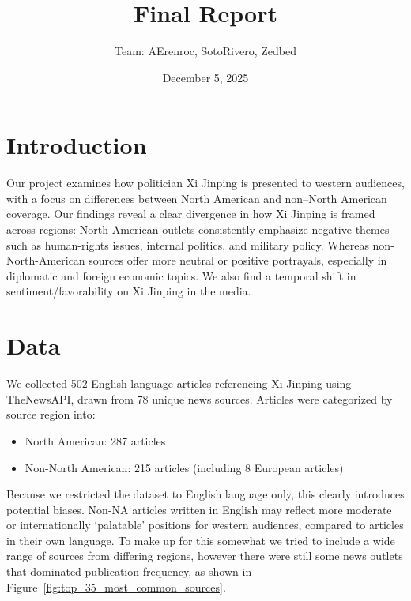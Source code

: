 \documentclass{article}
\title{Final Report}
\author{Team: AErenroc, SotoRivero, Zedbed}
\date{December 5, 2025}
\begin{document}
   \maketitle


   \section{Introduction}
   Our project examines how politician Xi Jinping is presented to western audiences, with a focus on differences between North American and non–North American coverage.
   Our findings reveal a clear divergence in how Xi Jinping is framed across regions: North American outlets consistently emphasize negative themes such as human-rights
    issues, internal politics, and military policy. Whereas non-North-American sources offer more neutral or positive portrayals, especially in diplomatic and foreign 
    economic topics. We also find a temporal shift in sentiment/favorability on Xi Jinping in the media. 
   

   \section{Data} %
   We collected 502 English-language articles referencing Xi Jinping using TheNewsAPI, 
   drawn from 78 unique news sources. Articles were categorized by source region into: 
   

   \begin{itemize}
      \item North American: 287 articles
      \item Non-North American: 215 articles (including 8 European articles)
   \end{itemize}
   Because we restricted the dataset to English language only, 
   this clearly introduces potential biases. Non-NA articles written in English may 
   reflect more moderate or internationally ‘palatable’ positions for western audiences, 
   compared to articles in their own language. To make up for this somewhat we tried to include a wide 
   range of sources from differing regions, however there were still some news outlets that
   dominated publication frequency, as shown in Figure~\ref{fig:top_35_most_common_sources}.
   
\end{document}
